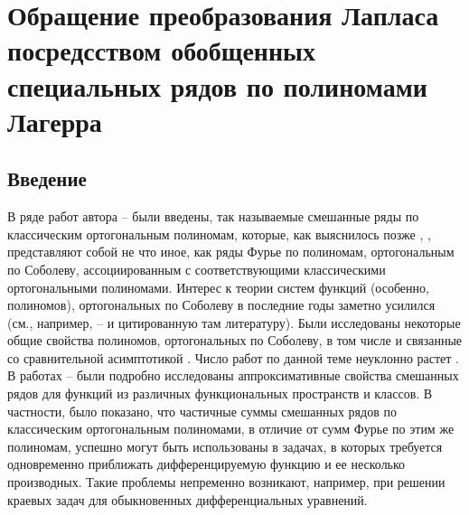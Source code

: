 \chapter{Обращение преобразования Лапласа посредсством обобщенных специальных рядов по  полиномами Лагерра}













\section{Введение}
В ряде работ автора \cite{Shar13} -- \cite{Shar16}  были введены, так называемые смешанные ряды по классическим ортогональным полиномам, которые, как выяснилось позже \cite{Shar11}, \cite{Shar12}, представляют собой не что иное, как ряды Фурье по полиномам, ортогональным по Соболеву, ассоциированным с соответствующими классическими ортогональными  полиномами.
Интерес к теории систем   функций (особенно, полиномов), ортогональных по Соболеву в последние годы заметно усилился (см., например, \cite{KwonLittl1} -- \cite{MarcelXu} и цитированную там литературу). Были исследованы некоторые общие свойства полиномов, ортогональных по Соболеву, в том числе и связанные со сравнительной асимптотикой \cite{MarcelVanash}. Число работ по данной теме  неуклонно растет  \cite{MarcelXu}. В работах \cite{Shar13} -- \cite{Shar12} были подробно исследованы аппроксимативные свойства смешанных рядов для функций из различных функциональных пространств и классов. В частности, было показано, что частичные суммы смешанных рядов по классическим ортогональным полиномами, в отличие от сумм Фурье по этим же полиномам, успешно могут быть использованы в задачах, в которых требуется одновременно приближать дифференцируемую функцию и ее несколько производных. Такие проблемы непременно возникают, например, при решении краевых задач для обыкновенных дифференциальных уравнений.

